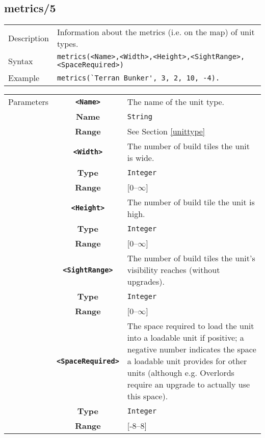 \subsection{metrics/5}
\begin{tabularx}{\textwidth}{lX}
 Description & Information about the metrics (i.e. on the map) of unit types. \\
 Syntax & \verb|metrics(<Name>,<Width>,<Height>,<SightRange>,<SpaceRequired>)| \\
 Example & \verb|metrics(`Terran Bunker', 3, 2, 10, -4).| \\
 \end{tabularx}
 \begin{tabularx}{\textwidth}{l | c | p{8cm}|}
 \cline{2-3}
 Parameters & \textbf{\verb|<Name>|} & The name of the unit type.\\
            & \textbf{Name} & \verb|String| \\
            & \textbf{Range} & See Section \ref{unittype} \\
            \cline{2-3}
            & \textbf{\verb|<Width>|} & The number of build tiles the unit is wide.\\
            & \textbf{Type} & \verb|Integer| \\
            & \textbf{Range} & [0--$\infty$] \\
            \cline{2-3}
            & \textbf{\verb|<Height>|} & The number of build tile the unit is high.\\
            & \textbf{Type} & \verb|Integer| \\
            & \textbf{Range} & [0--$\infty$] \\
            \cline{2-3}
            & \textbf{\verb|<SightRange>|} & The number of build tiles the unit's visibility reaches (without upgrades). \\
            & \textbf{Type} & \verb|Integer| \\
            & \textbf{Range} & [0--$\infty$] \\
            \cline{2-3}
            & \textbf{\verb|<SpaceRequired>|} & The space required to load the unit into a loadable unit if positive; a negative number indicates the space a loadable unit provides for other units (although e.g. Overlords require an upgrade to actually use this space).\\
            & \textbf{Type} & \verb|Integer| \\
            & \textbf{Range} & [-8--8] \\
            \cline{2-3}
\end{tabularx}

